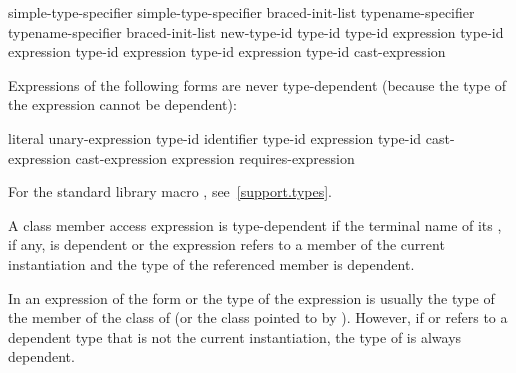 \begin{ncsimplebnf}
simple-type-specifier \terminal{(}  \terminal{)}\br
simple-type-specifier braced-init-list\br
typename-specifier \terminal{(}  \terminal{)}\br
typename-specifier braced-init-list\br
\opt{\terminal{::}}   new-type-id \br
\opt{\terminal{::}}   \terminal{(} type-id \terminal{)} \br
{} \terminal{<} type-id \terminal{>} \terminal{(} expression \terminal{)}\br
{} \terminal{<} type-id \terminal{>} \terminal{(} expression \terminal{)}\br
{} \terminal{<} type-id \terminal{>} \terminal{(} expression \terminal{)}\br
{} \terminal{<} type-id \terminal{>} \terminal{(} expression \terminal{)}\br
\terminal{(} type-id \terminal{)} cast-expression
\end{ncsimplebnf}

\pnum
Expressions of the following forms are never type-dependent (because the type
of the expression cannot be dependent):

\begin{ncsimplebnf}
literal\br
{} unary-expression\br
{} \terminal{(} type-id \terminal{)}\br
{}  \terminal{(} identifier \terminal{)}\br
{} \terminal{(} type-id \terminal{)}\br
{} \terminal{(} expression \terminal{)}\br
{} \terminal{(} type-id \terminal{)}\br
\opt{\terminal{::}}  cast-expression\br
\opt{\terminal{::}}  \terminal{[} \terminal{]} cast-expression\br
{} \br
{} \terminal{(} expression \terminal{)}\br
requires-expression
\end{ncsimplebnf}

\begin{note}
For the standard library macro ,
see~\ref{support.types}.
\end{note}

\pnum
A class member access expression is
type-dependent if
the terminal name of its , if any, is dependent or
the expression refers to a member of the current instantiation and
the type of the referenced member is dependent.
\begin{note}
In an expression of the form
or
the type of the expression is usually the type of the member
of the class of
(or the class pointed to by
).
However, if
or
refers to a dependent type that is not the current instantiation,
the type of
is always dependent.
\end{note}

